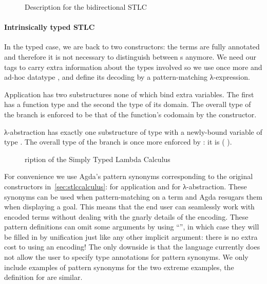 \begin{figure}[h]
\noindent\begin{minipage}[t]{0.35\textwidth}
\end{minipage}
\begin{minipage}[t]{0.65\textwidth}
\end{minipage}
  \caption{Description for the bidirectional STLC\label{fig:descBidiSTLC}}
\end{figure}

\paragraph{Intrinsically typed STLC}\label{par:intrinsicSTLC}
In the typed case, we are back to two
constructors: the terms are fully annotated and therefore it is not necessary
to distinguish between s anymore. We need our tags to carry extra
information about the types involved so we use once more and ad-hoc datatype
, and define its decoding  by a pattern-matching
λ-expression.

Application has two substructures none of which bind extra variables. The first
has a function type and the second the type of its domain. The overall type of
the branch is enforced to be that of the function's codomain by the 
constructor.

λ-abstraction has exactly one substructure of type  with a newly-bound
variable of type . The overall type of the branch is once more enforced
by : it is (  ).

\begin{figure}[h]
\caption{ription of the Simply Typed Lambda Calculus\label{fig:descstlc}\label{fig:descBidiSTLC}}
\end{figure}

For convenience we use Agda's pattern synonyms corresponding to the
original constructors in~\cref{sec:stlccalculus}:
 for application and  for λ-abstraction. These
synonyms can be used when pattern-matching on a term and Agda resugars
them when displaying a goal. This means that the end user can
seamlessly work with encoded terms without dealing with the gnarly
details of the encoding.  These pattern definitions can omit some
arguments by using ``\AS{\_}'', in which case they will be filled in
by unification just like any other implicit argument: there is no
extra cost to using an encoding!  The only downside is that the
language currently does not allow the user to specify type annotations
for pattern synonyms. We only include examples of pattern synonyms
for the two extreme examples, the definition for  are similar.

